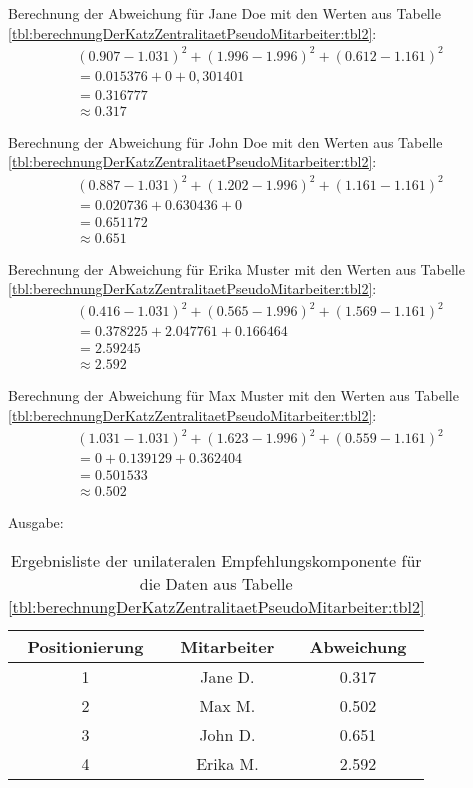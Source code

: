 Berechnung der Abweichung für Jane Doe mit den Werten aus Tabelle \ref{tbl:berechnungDerKatzZentralitaetPseudoMitarbeiter:tbl2}:
\begin{gather}
	\nonumber (0.907-1.031)^2 + (1.996-1.996)^2 + (0.612-1.161)^2\\
	\nonumber = 0.015376 + 0 + 0,301401\\
	\nonumber = 0.316777\\
	\approx 0.317
	\label{frml:nebenrechnungen:unilateral:jane}
\end{gather}

Berechnung der Abweichung für John Doe mit den Werten aus Tabelle \ref{tbl:berechnungDerKatzZentralitaetPseudoMitarbeiter:tbl2}:
\begin{gather}
	\nonumber (0.887-1.031)^2 + (1.202-1.996)^2 + (1.161-1.161)^2\\
	\nonumber = 0.020736 + 0.630436 + 0\\
	\nonumber = 0.651172\\
	\approx 0.651
	\label{frml:nebenrechnungen:unilateral:john}
\end{gather}

Berechnung der Abweichung für Erika Muster mit den Werten aus Tabelle \ref{tbl:berechnungDerKatzZentralitaetPseudoMitarbeiter:tbl2}:
\begin{gather}
	\nonumber (0.416-1.031)^2 + (0.565-1.996)^2 + (1.569-1.161)^2\\
	\nonumber = 0.378225 + 2.047761 + 0.166464\\
	\nonumber = 2.59245\\
	\approx 2.592
	\label{frml:nebenrechnungen:unilateral:erika}
\end{gather}

Berechnung der Abweichung für Max Muster mit den Werten aus Tabelle \ref{tbl:berechnungDerKatzZentralitaetPseudoMitarbeiter:tbl2}:
\begin{gather}
	\nonumber (1.031-1.031)^2 + (1.623-1.996)^2 + (0.559-1.161)^2\\
	\nonumber = 0 + 0.139129 + 0.362404\\
	\nonumber = 0.501533\\
	\approx 0.502
	\label{frml:nebenrechnungen:unilateral:max}
\end{gather}

Ausgabe:
\begin{table}[h]
	\centering
	\begin{tabular}{c|c|c}
		Positionierung & Mitarbeiter & Abweichung\\
		\hline
		1 & Jane D.  & 0.317\\
		2 & Max M.   & 0.502\\
		3 & John D.  & 0.651\\
		4 & Erika M. & 2.592
	\end{tabular}
	\caption{Ergebnisliste der unilateralen Empfehlungskomponente für die Daten aus Tabelle \ref{tbl:berechnungDerKatzZentralitaetPseudoMitarbeiter:tbl2}}
	\label{tbl:nebenrechnungen:unilateral:ausgabe}
\end{table}